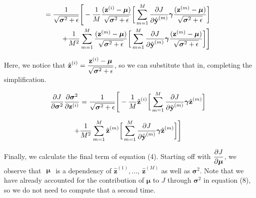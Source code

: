 \documentclass{article}
\begin{document}
\begin{multicols}{2}
$$\begin{aligned}
    = {1 \over \sqrt{\boldsymbol{\sigma}^2 + \epsilon}}\Bigg[-{1 \over M} {(\textbf{z}^{(i)} - \boldsymbol{\mu})\over \sqrt{\boldsymbol{\sigma}^2 + \epsilon}} \bigg[
        \sum_{m = 1}^M {\partial J \over \partial \hat{\textbf{y}}^{(m)}} 
        \boldsymbol{\gamma}
        {(\textbf{z}^{(m)} - \boldsymbol{\mu})\over \sqrt{\boldsymbol{\sigma}^2 + \epsilon}} \bigg]\\
        +{1 \over M^2} \sum_{m=1}^M {(\textbf{z}^{(m)} - \boldsymbol{\mu})\over \sqrt{\boldsymbol{\sigma}^2 + \epsilon}}
        \bigg[
        \sum_{m = 1}^M {\partial J \over \partial \hat{\textbf{y}}^{(m)}} 
        \boldsymbol{\gamma}
        {(\textbf{z}^{(m)} - \boldsymbol{\mu})\over \sqrt{\boldsymbol{\sigma}^2 + \epsilon}}\bigg]\Bigg]
\end{aligned}$$

Here, we notice that $\begin{aligned}
    \hat{\textbf{z}}^{(i)} = {\textbf{z}^{(i)} - \boldsymbol{\mu} \over \sqrt{\boldsymbol{\sigma}^2 + \epsilon}}
\end{aligned}$, so we can substitute that in, completing the simplification.

$$\begin{aligned}
    {\partial J \over \partial \boldsymbol{\sigma}^2} 
    {\partial \boldsymbol{\sigma}^2 \over \partial \textbf{z}^{(i)}}
    = {1 \over \sqrt{\boldsymbol{\sigma}^2 + \epsilon}}\Bigg[-{1 \over M} \hat{\textbf{z}}^{(i)} \bigg[
        \sum_{m = 1}^M {\partial J \over \partial \hat{\textbf{y}}^{(m)}} 
        \boldsymbol{\gamma}
        \hat{\textbf{z}}^{(m)} \bigg]
\end{aligned}$$

\begin{equation}
    +{1 \over M^2} \sum_{m=1}^M \hat{\textbf{z}}^{(m)}
        \bigg[
        \sum_{m = 1}^M {\partial J \over \partial \hat{\textbf{y}}^{(m)}} 
        \boldsymbol{\gamma}
        \hat{\textbf{z}}^{(m)}\bigg]\Bigg]
\end{equation}

Finally, we calculate the final term of equation (4). Starting off
with $\begin{aligned}
    {\partial J \over \partial \boldsymbol{\mu}}
\end{aligned}$, we observe that $\begin{aligned}
    \boldsymbol{\mu} 
\end{aligned}$ is a dependency of $\hat{\textbf{z}}^{(1)},...,\ \hat{\textbf{z}}^{(M)}$
as well as $\boldsymbol{\sigma}^2$. Note that we have already accounted for
the contribution of $\boldsymbol{\mu}$ to $J$ through $\boldsymbol{\sigma}^2$
in equation (8), so we do not need to compute that a second time.


\end{multicols}
\end{document}
